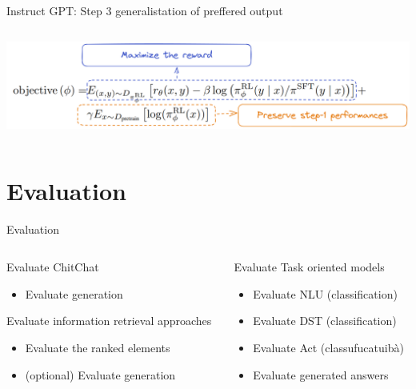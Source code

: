 \documentclass[10pt,aspectratio=169]{beamer}
\begin{document}
\begin{frame}{Instruct GPT: Step 3 generalistation of preffered output}
\begin{columns}
\begin{column}{0.6\textwidth}
\begin{figure}
            \end{figure}
            \includegraphics[width=1.\textwidth]{media/instruct_gpt_formula.png}
        \end{column}
    \end{columns}
\end{frame}

\section{Evaluation}

\begin{frame}{Evaluation}
    \begin{columns}
        \begin{column}{0.5\textwidth}
            \begin{block}{Evaluate  ChitChat}
                \begin{itemize}
                    \item Evaluate generation 
                \end{itemize}
            \end{block}
            \begin{block}{Evaluate information retrieval approaches}
                \begin{itemize}
                    \item Evaluate the ranked elements
                    \item (optional) Evaluate generation 
                \end{itemize}
            \end{block}    
        \end{column}
        \begin{column}{0.5\textwidth}
            \begin{block}{Evaluate Task oriented models}
                \begin{itemize}
                    \item Evaluate NLU (classification)
                    \item Evaluate DST (classification)
                    \item Evaluate Act (classufucatuibà)
                    \item Evaluate generated answers
                \end{itemize}
            \end{block}
        \end{column}
    \end{columns}

\end{frame}
\end{document}
